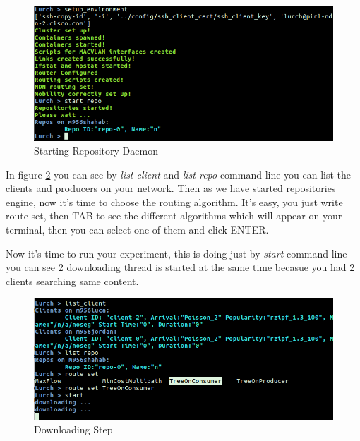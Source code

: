 \begin{figure}[H]

\begin{center}

\includegraphics[scale = 0.35]{Pictures/start_repo.png}

\caption{Starting Repository Daemon} \label{repo} 

\end{center}

\end{figure}




In figure \ref{download} you can see by \textit{list client} and \textit{list repo} command line you can list the clients and producers on your network. Then as we have started repositories engine, now it's time to choose the routing algorithm. It's easy, you just write route set, then TAB to see the different algorithms which will appear on your terminal, then you can select one of them and click ENTER.

Now it's time to run your experiment, this is doing just by \textit{start} command line you can see 2 downloading thread is started at the same time becasue you had 2 clients searching same content.  

\begin{figure}[H]

\begin{center}

\includegraphics[scale = 0.35]{Pictures/download.png}

\caption{Downloading Step} \label{download} 

\end{center}

\end{figure}


